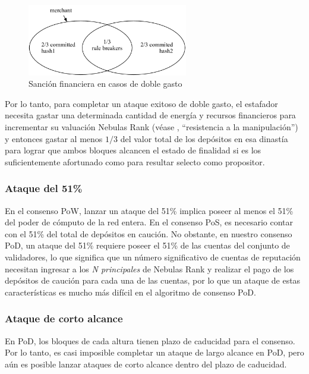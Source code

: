 \begin{figure}[h]
\centering
\includegraphics[width=7cm]{./figs/overlap}
\caption{Sanción financiera en casos de doble gasto}
\label{fig:double_spend}
\end{figure}

Por lo tanto, para completar un ataque exitoso de doble gasto, el estafador necesita gastar una determinada cantidad de energía y recursos financieros para incrementar su valuación Nebulas Rank (véase , “resistencia a la manipulación”) y entonces gastar al menos $1/3$ del valor total de los depósitos en esa dinastía para lograr que ambos bloques alcancen el estado de finalidad si es los suficientemente afortunado como para resultar selecto como propositor.

\subsubsection*{Ataque del 51\%}
\label{pod:economic:fraud:51attack}

En el consenso PoW, lanzar un ataque del 51\% implica poseer al menos el 51\% del poder de cómputo de la red entera. En el consenso PoS, es necesario contar con el 51\% del total de depósitos en caución. No obstante, en nuestro consenso PoD, un ataque del 51\% requiere poseer el 51\% de las cuentas del conjunto de validadores, lo que significa que un número significativo de cuentas de reputación necesitan ingresar a los \textit{N principales} de Nebulas Rank y realizar el pago de los depósitos de caución para cada una de las cuentas, por lo que un ataque de estas características es mucho más difícil en el algoritmo de consenso PoD.

\subsubsection*{Ataque de corto alcance}
\label{pod:economic:fraud:short_range_attack}

En PoD, los bloques de cada altura tienen plazo de caducidad para el consenso. Por lo tanto, es casi imposible completar un ataque de largo alcance en PoD, pero aún es posible lanzar ataques de corto alcance dentro del plazo de caducidad.


